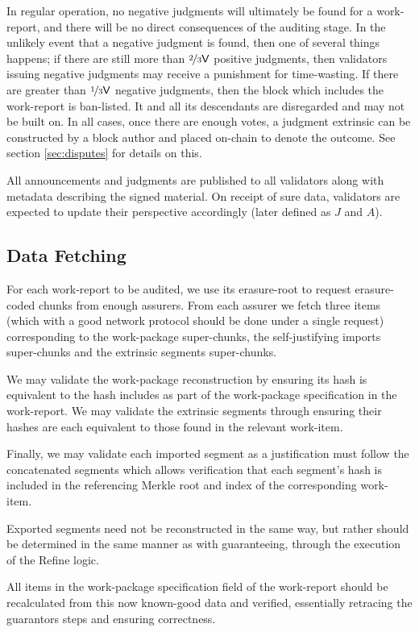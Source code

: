 In regular operation, no negative judgments will ultimately be found for a work-report, and there will be no direct consequences of the auditing stage. In the unlikely event that a negative judgment is found, then one of several things happens; if there are still more than $\nicefrac{2}{3}\mathsf{V}$ positive judgments, then validators issuing negative judgments may receive a punishment for time-wasting. If there are greater than $\nicefrac{1}{3}\mathsf{V}$ negative judgments, then the block which includes the work-report is ban-listed. It and all its descendants are disregarded and may not be built on. In all cases, once there are enough votes, a judgment extrinsic can be constructed by a block author and placed on-chain to denote the outcome. See section \ref{sec:disputes} for details on this.

All announcements and judgments are published to all validators along with metadata describing the signed material. On receipt of sure data, validators are expected to update their perspective accordingly (later defined as $J$ and $A$).

\subsection{Data Fetching}

For each work-report to be audited, we use its erasure-root to request erasure-coded chunks from enough assurers. From each assurer we fetch three items (which with a good network protocol should be done under a single request) corresponding to the work-package super-chunks, the self-justifying imports super-chunks and the extrinsic segments super-chunks.

We may validate the work-package reconstruction by ensuring its hash is equivalent to the hash includes as part of the work-package specification in the work-report. We may validate the extrinsic segments through ensuring their hashes are each equivalent to those found in the relevant work-item.

Finally, we may validate each imported segment as a justification must follow the concatenated segments which allows verification that each segment's hash is included in the referencing Merkle root and index of the corresponding work-item.

Exported segments need not be reconstructed in the same way, but rather should be determined in the same manner as with guaranteeing, \ie through the execution of the Refine logic.

All items in the work-package specification field of the work-report should be recalculated from this now known-good data and verified, essentially retracing the guarantors steps and ensuring correctness.


